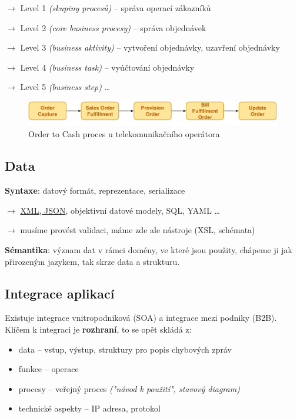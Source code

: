 $\to$ Level 1 \textit{(skupiny procesů)} -- správa operací zákazníků

$\to$ Level 2 \textit{(core business procesy)} -- správa objednávek

$\to$ Level 3 \textit{(business aktivity)} -- vytvoření objednávky, uzavření objednávky

$\to$ Level 4 \textit{(business task)} -- vyúčtování objednávky

$\to$ Level 5 \textit{(business step)} \ldots

\begin{figure}[H]
    \centering
    \includegraphics[width=\textwidth]{fig/02-order-to-cash}
    \caption{Order to Cash proces u telekomunikačního operátora}
\end{figure}

\subsection{Data}

\textbf{Syntaxe}: datový formát, reprezentace, serializace

$\to$ \underline{XML, JSON}, objektivní datové modely, SQL, YAML \ldots

$\to$ musíme provést validaci, máme zde ale nástroje (XSL, schémata)

\vspace{4pt}

\noindent \textbf{Sémantika}: význam dat v rámci domény, ve které jsou použity, chápeme ji jak přirozeným jazykem, tak skrze data a strukturu.

\subsection{Integrace aplikací}

Existuje integrace vnitropodniková (SOA) a integrace mezi podniky (B2B). Klíčem k integraci je \textbf{rozhraní}, to se opět skládá z:

\begin{itemize}
    \item data -- vstup, výstup, struktury pro popis chybových zpráv
    \item funkce -- operace
    \item procesy -- veřejný proces \textit{("návod k použití", stavový diagram)}
    \item technické aspekty -- IP adresa, protokol
\end{itemize}

